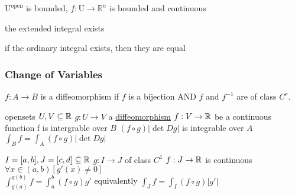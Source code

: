 \LET
$\mathrm{U^{open}}$ is bounded,
$f:\mathrm{U}\to\mathbb{R}^n $ is bounded and continuous\\
\THEN
\begin{myenumerate}
\item the extended integral exists
\item if the ordinary integral exists, then they are equal
\end{myenumerate}

\subsubsection{Change of Variables}

$f: A\to B$ is a diffeomorphism if
$f$ is a bijection AND $f$ and $f^{-1}$ are of class $C^r$.

\LET
opensets $U, V \subseteq {\mathbb R}$\newline
$g: U\to V$ a \hyperref[kw:diffeomorphism]{diffeomorphism}\newline
$f:V\to {\mathbb R}$ be a continuous function\newline
\THEN f is intergrable over $B$\newline
\IFF $(f\circ g)|\det D g|$ is integrable over $A$\\
\RMK $\int_B f = \int_A(f\circ g)|\det D g|$

\LET
$I=[a,b], J=[c,d]\subseteq{\mathbb R}$\newline
$g:I\to J$ of class $C^1$\newline
$f:J\to {\mathbb R}$ is continuous\newline
\IF $\forall x\in(a,b) \left[g'(x)\neq 0\right]$\\
\THEN $\int^{g(b)}_{g(a)}f=\int^b_a (f\circ g)g'$\newline
equivalently $\int_J f=\int_I (f\circ g)|g'|$


